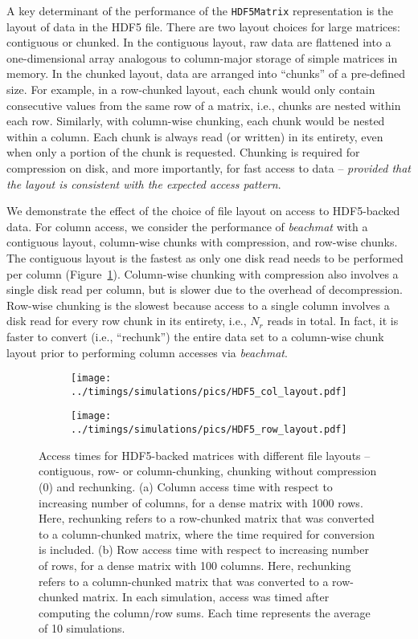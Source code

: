 \documentclass[10pt,letterpaper]{article}
\newcommand{\beachmat}{\textit{beachmat}}
\newcommand{\code}[1]{\texttt{#1}}
\begin{document}
A key determinant of the performance of the \code{HDF5Matrix} representation is the layout of data in the HDF5 file.
There are two layout choices for large matrices: contiguous or chunked.
In the contiguous layout, raw data are flattened into a one-dimensional array analogous to column-major storage of simple matrices in memory.
In the chunked layout, data are arranged into ``chunks'' of a pre-defined size.
For example, in a row-chunked layout, each chunk would only contain consecutive values from the same row of a matrix, i.e., chunks are nested within each row.
Similarly, with column-wise chunking, each chunk would be nested within a column.
Each chunk is always read (or written) in its entirety, even when only a portion of the chunk is requested.
Chunking is required for compression on disk, and more importantly, for fast access to data -- \textit{provided that the layout is consistent with the expected access pattern}.

We demonstrate the effect of the choice of file layout on access to HDF5-backed data.
For column access, we consider the performance of \beachmat{} with a contiguous layout, column-wise chunks with compression, and row-wise chunks.
The contiguous layout is the fastest as only one disk read needs to be performed per column (Figure~\ref{fig:hdf5layout}).
Column-wise chunking with compression also involves a single disk read per column, but is slower due to the overhead of decompression.
Row-wise chunking is the slowest because access to a single column involves a disk read for every row chunk in its entirety, i.e., $N_r$ reads in total.
In fact, it is faster to convert (i.e., ``rechunk'') the entire data set to a column-wise chunk layout prior to performing column accesses via \beachmat{}.

\begin{figure}[bt]
    \begin{subfigure}[b]{0.49\textwidth}
        \texttt{[image: ../timings/simulations/pics/HDF5\_col\_layout.pdf]}
        \caption{}
    \end{subfigure}
    \begin{subfigure}[b]{0.49\textwidth}
        \texttt{[image: ../timings/simulations/pics/HDF5\_row\_layout.pdf]}
        \caption{}
    \end{subfigure}
    \caption{Access times for HDF5-backed matrices with different file layouts -- contiguous, row- or column-chunking, chunking without compression (0) and rechunking. 
        (a) Column access time with respect to increasing number of columns, for a dense matrix with 1000 rows.
        Here, rechunking refers to a row-chunked matrix that was converted to a column-chunked matrix, where the time required for conversion is included.
        (b) Row access time with respect to increasing number of rows, for a dense matrix with 100 columns.
        Here, rechunking refers to a column-chunked matrix that was converted to a row-chunked matrix.
        In each simulation, access was timed after computing the column/row sums.
        Each time represents the average of 10 simulations.
    }
    \label{fig:hdf5layout}
\end{figure}
\end{document}
